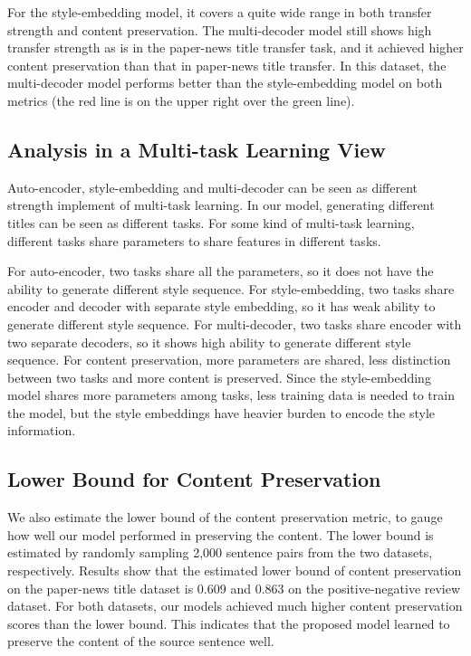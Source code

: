 \documentclass[letterpaper]{article} \usepackage{aaai18}  \usepackage{times}  \usepackage{helvet}  \usepackage{courier}  \usepackage{url}  \usepackage{graphicx}  \usepackage{amsmath}
\begin{document}
For the style-embedding model, it covers a quite wide range in both transfer strength and content preservation. 
The multi-decoder model still shows high transfer strength as is in the paper-news title transfer task, and it achieved higher content preservation than 
that in paper-news title transfer. 
In this dataset, the multi-decoder model performs better than the style-embedding model on both metrics (the red line is on the upper right over the green line).  

\subsection{Analysis in a Multi-task Learning View}
Auto-encoder, style-embedding and multi-decoder can be seen as different strength implement of multi-task learning. In our model, generating different titles can be seen as different tasks. For some kind of multi-task learning, different tasks share parameters to share features in different tasks.

For auto-encoder, two tasks share all the parameters, so it does not have the ability to generate different style sequence. For style-embedding, two tasks share encoder and decoder with separate style embedding, so it has weak ability to generate different style sequence. For multi-decoder, two tasks share encoder with two separate decoders, so it shows high ability to generate different style sequence. For content preservation, more parameters are shared, less distinction between two tasks and more content is preserved.
Since the style-embedding model shares more parameters among tasks, less training data is needed to train the model, but the style embeddings have heavier burden to encode the style information.


\subsection{Lower Bound for Content Preservation}
We also estimate the lower bound of the content preservation metric, to gauge how well our model performed in preserving the content. 
The lower bound is estimated by randomly sampling 2,000 sentence pairs from the two datasets, respectively. 
Results show that the estimated lower bound of content preservation on the paper-news title dataset is 0.609 and 0.863 on the positive-negative review dataset. 
For both datasets, our models achieved much higher content preservation scores than the lower bound. 
This indicates that the proposed model learned to preserve the content of the source sentence well.
\end{document}
